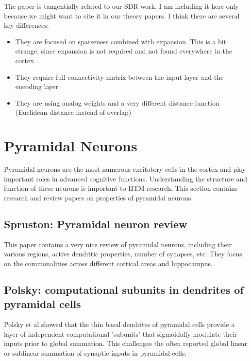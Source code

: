 \documentclass{article} %
\begin{document}
The paper \cite{Babadi2014} is tangentially related to our SDR work. I am
including it here only because we might want to cite it in our
theory papers. I think there are several key differences:

\begin{itemize}
\item They are focused on sparseness combined with expansion. This is a bit
strange, since expansion is not required and not found everywhere in the cortex.

\item They require full connectivity matrix between the input layer and the
encoding layer

\item They are using analog weights and a very different distance function
(Euclidean distance instead of overlap)

\end{itemize}

\section{Pyramidal Neurons}

Pyramidal neurons are the most numerous excitatory cells in the cortex and play
important roles in advanced cognitive functions. Understanding the
structure and function of
these neurons is important to HTM research.   This section  contains research
and review papers on properties of pyramidal neurons.

\subsection{Spruston: Pyramidal neuron review}

This paper \cite{Spruston2008} contains a very nice review of
pyramidal neurons, including their various regions, active dendritic
properties, number of synapses, etc. They focus on the commonalities across
different cortical areas and hippocampus.

\subsection{Polsky: computational subunits in dendrites of pyramidal cells}
Polsky et al \cite{Polsky2004} showed that the thin basal dendrites of pyramidal
cells provide a layer of independent computational 'subunits' that sigmoidally 
modulate their inputs prior to global summation. This challenges the often reported 
global linear or sublinear summation of synaptic inputs in pyramidal cells.
\end{document}
